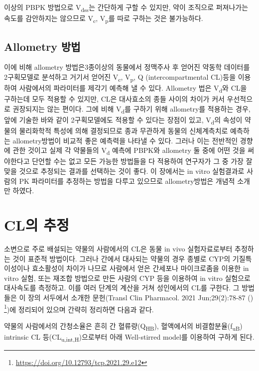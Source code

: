 \documentclass[
  11pt,
  krantz2, a4paper, twoside]{krantz}
\begin{document}
이상의 PBPK 방법으로 V\textsubscript{dss}는 간단하게 구할 수 있지만, 약이 조직으로
퍼져나가는 속도를 감안하지는 않으므로 V\textsubscript{c}, V\textsubscript{p}를 따로 구하는 것은
불가능하다.

\subsection{Allometry 방법}\label{allometry-uxbc29uxbc95}

이에 비해 allometry 방법은3종이상의 동물에서 정맥주사 후 얻어진 약동학
데이터를 2구획모델로 분석하고 거기서 얻어진 V\textsubscript{c}, V\textsubscript{p}, Q
(intercompartmental CL)등을 이용하여 사람에서의 파라미터를 제각기 예측해
낼 수 있다. Allometry 법은 V\textsubscript{d}와 CL을 구하는데 모두 적용할 수 있지만,
CL은 대사효소의 종들 사이의 차이가 커서 우선적으로 권장되지는 않는
편이다. 그에 비해 V\textsubscript{d}를 구하기 위해 allometry를 적용하는 경우, 앞에
기술한 바와 같이 2구획모델에도 적용할 수 있다는 장점이 있고, V\textsubscript{d}의
속성이 약물의 물리화학적 특성에 의해 결정되므로 종과 무관하게 동물의
신체계측치로 예측하는 allometry방법이 비교적 좋은 예측력을 나타낼 수
있다. 그러나 이는 전반적인 경향에 관한 것이고 실제 각 약물들의 V\textsubscript{d}
예측에 PBPK와 allometry 둘 중에 어떤 것을 써야한다고 단언할 수는 없고
모든 가능한 방법들을 다 적용하여 연구자가 그 중 가장 잘 맞을 것으로
추정되는 결과를 선택하는 것이 좋다. 이 장에서는 in vitro 실험결과로
사람의 PK 파라미터를 추정하는 방법을 다루고 있으므로 allometry방법은
개념적 소개만 하였다.

\section{CL의 추정}\label{cluxc758-uxcd94uxc815}

소변으로 주로 배설되는 약물의 사람에서의 CL은 동물 in vivo
실험자료로부터 추정하는 것이 표준적 방법이다. 그러나 간에서 대사되는
약물의 경우 종별로 CYP의 기질특이성이나 효소활성이 차이가 나므로
사람에서 얻은 간세포나 마이크로좀을 이용한 in vitro 실험, 또는 재조합
방법으로 만든 사람의 CYP 등을 이용하여 in vitro 실험으로 대사속도를
측정하고. 이를 여러 단계의 계산을 거쳐 성인에서의 CL를 구한다. 그
방법들은 이 장의 서두에서 소개한 문헌(Transl Clin Pharmacol. 2021
Jun;29(2):78-87 () \footnote{\url{https://doi.org/10.12793/tcp.2021.29.e12}})에 정리되어
있으며 간략히 정리하면 다음과 같다.

약물의 사람에서의 간청소율은 흔히 간 혈류량(Q\textsubscript{HB}), 혈액에서의
비결합분율(f\textsubscript{uB}) intrinsic CL 등(CL\textsubscript{u,int,H})으로부터 아래 Well-stirred
model를 이용하여 구하게 된다.
\end{document}
